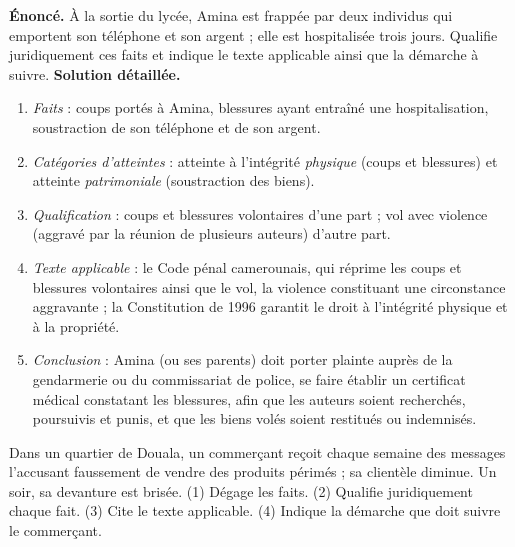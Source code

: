 \documentclass[11pt]{article}
\begin{document}
\begin{exoresolu}
\textbf{Énoncé.} À la sortie du lycée, Amina est frappée par deux individus qui emportent son téléphone et son argent ; elle est hospitalisée trois jours. Qualifie juridiquement ces faits et indique le texte applicable ainsi que la démarche à suivre.
\tcblower
\textbf{Solution détaillée.}
\begin{enumerate}
\item \emph{Faits} : coups portés à Amina, blessures ayant entraîné une hospitalisation, soustraction de son téléphone et de son argent.
\item \emph{Catégories d'atteintes} : atteinte à l'intégrité \emph{physique} (coups et blessures) et atteinte \emph{patrimoniale} (soustraction des biens).
\item \emph{Qualification} : coups et blessures volontaires d'une part ; vol avec violence (aggravé par la réunion de plusieurs auteurs) d'autre part.
\item \emph{Texte applicable} : le Code pénal camerounais, qui réprime les coups et blessures volontaires ainsi que le vol, la violence constituant une circonstance aggravante ; la Constitution de 1996 garantit le droit à l'intégrité physique et à la propriété.
\item \emph{Conclusion} : Amina (ou ses parents) doit porter plainte auprès de la gendarmerie ou du commissariat de police, se faire établir un certificat médical constatant les blessures, afin que les auteurs soient recherchés, poursuivis et punis, et que les biens volés soient restitués ou indemnisés.
\end{enumerate}
\end{exoresolu}

\begin{exercice}
Dans un quartier de Douala, un commerçant reçoit chaque semaine des messages l'accusant faussement de vendre des produits périmés ; sa clientèle diminue. Un soir, sa devanture est brisée. (1) Dégage les faits. (2) Qualifie juridiquement chaque fait. (3) Cite le texte applicable. (4) Indique la démarche que doit suivre le commerçant.
\end{exercice}
\end{document}
